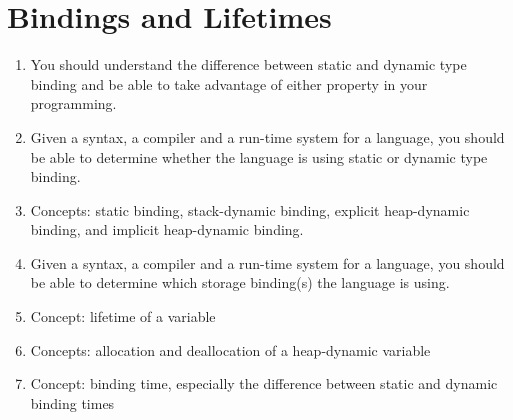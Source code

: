 \section{Bindings and Lifetimes}\label{sec:Bindings_Lifetimes}

\begin{enumerate}[noitemsep]
\item You should understand the difference between static and dynamic type binding and be able to take advantage of either property in your programming.
\item Given a syntax, a compiler and a run-time system for a language, you should be able to determine whether the language is using static or dynamic type binding.
\item Concepts: static binding, stack-dynamic binding, explicit heap-dynamic binding, and implicit heap-dynamic binding.
\item Given a syntax, a compiler and a run-time system for a language, you should be able to determine which storage binding(s) the language is using.
\item Concept: lifetime of a variable
\item Concepts: allocation and deallocation of a heap-dynamic variable
\item Concept: binding time, especially the difference between static and dynamic binding times
\end{enumerate}


